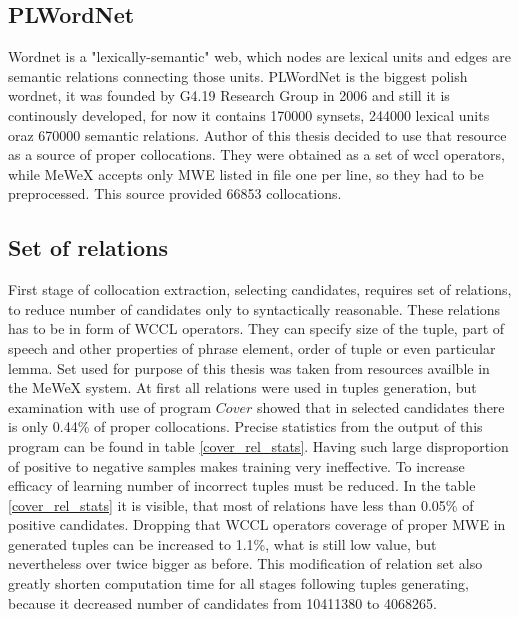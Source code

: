 \subsection{PLWordNet}
Wordnet is a "lexically-semantic" web, which nodes are lexical units and edges are semantic relations connecting those units.
PLWordNet is the biggest polish wordnet, it was founded by G4.19 Research Group in 2006 and still it is continously developed, 
for now it contains 170000 synsets, 244000 lexical units oraz 670000 semantic relations. Author of this thesis decided to use that resource 
as a source of proper collocations. They were obtained as a set of wccl operators, while MeWeX accepts only MWE listed in file one per line, 
so they had to be preprocessed. This source provided 66853 collocations.

\subsection{Set of relations}
First stage of collocation extraction, selecting candidates, requires set of relations, to reduce number of candidates only to syntactically reasonable. 
These relations has to be in form of WCCL operators. They can specify size of the tuple, part of speech and other properties of phrase element, 
order of tuple or even particular lemma. Set used for purpose of this thesis was taken from resources availble in the MeWeX system. 
At first all relations were used in tuples generation, but examination with use of program \(Cover\) showed that in selected candidates 
there is only 0.44\% of proper collocations. Precise statistics from the output of this program can be found in table \ref{cover_rel_stats}.
Having such large disproportion of positive to negative samples makes training very ineffective. To increase efficacy of learning 
number of incorrect tuples must be reduced. In the table \ref{cover_rel_stats} it is visible, that most of relations have less than 0.05\% 
of positive candidates. Dropping that WCCL operators coverage of proper MWE in generated tuples can be increased to 1.1\%, 
what is still low value, but nevertheless over twice bigger as before. This modification of relation set also greatly shorten computation time 
for all stages following tuples generating, because it decreased number of candidates from 10411380 to 4068265.

